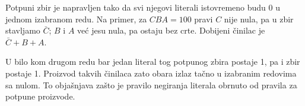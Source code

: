 
Potpuni zbir je napravljen tako da svi njegovi literali istovremeno budu 0 u jednom izabranom redu. Na primer, za \(CBA=100\) pravi \(C\) nije nula, pa u zbir stavljamo \(\bar C\); \(B\) i \(A\) već jesu nula, pa ostaju bez crte. Dobijeni činilac je \(\bar C+B+A\).

U bilo kom drugom redu bar jedan literal tog potpunog zbira postaje 1, pa i zbir postaje 1. Proizvod takvih činilaca zato obara izlaz tačno u izabranim redovima sa nulom. To objašnjava zašto je pravilo negiranja literala obrnuto od pravila za potpune proizvode.
